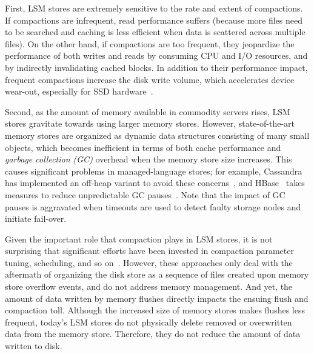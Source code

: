 First, 
LSM stores  are extremely sensitive to the rate and extent of compactions. If compactions are infrequent, read performance
suffers (because more files need to be searched and caching is less efficient when  data is scattered across multiple files). On the other hand, if 
compactions are too frequent, they jeopardize the performance of both writes and reads by consuming CPU and I/O resources, and by indirectly invalidating cached blocks. 
In addition to their performance impact, frequent compactions increase the disk write volume, which  
accelerates device wear-out, especially for SSD hardware~\cite{Hu:2009}. 

Second, as the amount of memory available in commodity servers rises, LSM stores gravitate towards using larger memory stores.
However, state-of-the-art memory stores are organized as dynamic data structures consisting of many 
small objects, which becomes inefficient in terms of both cache performance and 
\emph{garbage collection (GC)} overhead when the memory store size increases.
%
This causes significant problems in managed-language stores; for example, Cassandra~\cite{cassandra} has implemented an off-heap variant to avoid these concerns~\cite{cassandraoffheap}, 
and HBase~\cite{hbase} takes measures to reduce 
unpredictable GC pauses~\cite{hbasemslab}.  
Note that the impact of GC pauses is aggravated when timeouts are used to detect faulty storage nodes and initiate fail-over.



Given the important role that compaction plays in LSM stores, it is not surprising that 
significant efforts have been invested in compaction parameter tuning, scheduling, and so on~\cite{hbasetuning,
universalcompaction,scylladbcompaction,Sears:2012}. However, these approaches only deal with the aftermath
of organizing the disk store as a sequence of files created upon memory store overflow events, and do not 
address memory management. 
And yet, the amount of data written by memory flushes  
directly impacts the ensuing flush and compaction toll. 
Although the increased size of  memory stores makes flushes less frequent, 
today's LSM stores do not physically delete removed or overwritten data from the memory store. 
Therefore, they do not reduce the amount of data written to disk.

